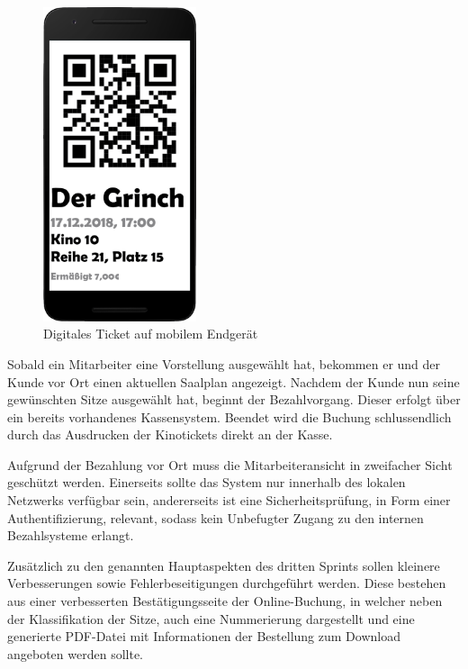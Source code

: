 \begin{figure}[ht]
	\centering
	\includegraphics[width=0.4\textwidth]{img/ticket_phone}
	\captionsetup{format=hang}
	\caption{Digitales Ticket auf mobilem Endgerät}
	\label{fig:ticket_phone}
\end{figure}

Sobald ein Mitarbeiter eine Vorstellung ausgewählt hat, bekommen er und der Kunde vor Ort einen aktuellen Saalplan angezeigt.
Nachdem der Kunde nun seine gewünschten Sitze ausgewählt hat, beginnt der Bezahlvorgang.
Dieser erfolgt über ein bereits vorhandenes Kassensystem.
Beendet wird die Buchung schlussendlich durch das Ausdrucken der Kinotickets direkt an der Kasse.

Aufgrund der Bezahlung vor Ort muss die Mitarbeiteransicht in zweifacher Sicht geschützt werden.
Einerseits sollte das System nur innerhalb des lokalen Netzwerks verfügbar sein, andererseits ist eine Sicherheitsprüfung, in Form einer Authentifizierung, relevant, sodass kein Unbefugter Zugang zu den internen Bezahlsysteme erlangt.

Zusätzlich zu den genannten Hauptaspekten des dritten Sprints sollen kleinere Verbesserungen sowie Fehlerbeseitigungen durchgeführt werden.
Diese bestehen aus einer verbesserten Bestätigungsseite der Online-Buchung, in welcher neben der Klassifikation der Sitze, auch eine Nummerierung dargestellt und eine generierte PDF-Datei mit Informationen der Bestellung zum Download angeboten werden sollte.

